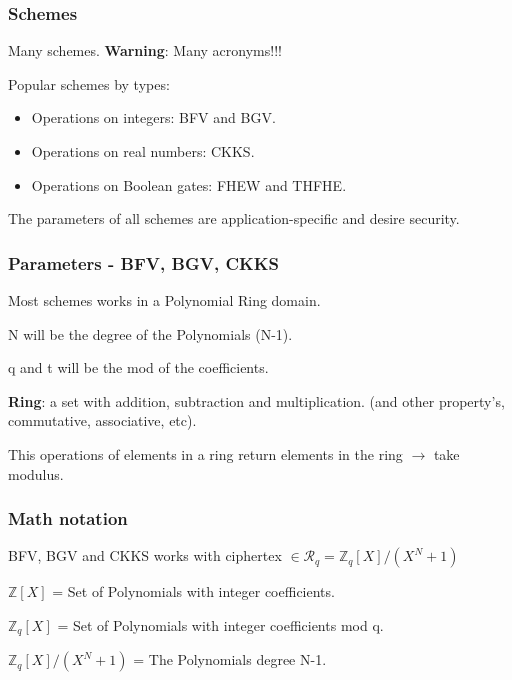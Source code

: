 \documentclass[10pt,handout]{beamer}
\begin{document}


\begin{frame}
    \frametitle{Schemes}

    Many schemes. \textbf{Warning}: Many acronyms!!!

    Popular schemes by types:
    \begin{itemize}
        \item Operations on integers: BFV and BGV.
        \item Operations on real numbers: CKKS.
        \item Operations on Boolean gates: FHEW and THFHE.
    \end{itemize}


    The parameters of all schemes are application-specific and desire security.
\end{frame}



\begin{frame}
\frametitle{Parameters - BFV, BGV, CKKS}

Most schemes works in a Polynomial Ring domain.

N will be the degree of the Polynomials (N-1).

q and t will be the mod of the coefficients.

\textbf{Ring}: a set with addition, subtraction and multiplication. (and other property's, commutative, associative, etc).

This operations of elements in a ring return elements in the ring $\rightarrow$ take modulus.




\end{frame}



\begin{frame}
\frametitle{Math notation}
BFV, BGV and CKKS works with ciphertex  $\in \mathcal{R}_q =\mathbb{Z}_q[X]/(X^N+1)$

$\mathbb{Z}[X]$ = Set of Polynomials with integer coefficients.

$\mathbb{Z}_q[X]$ = Set of Polynomials with integer coefficients mod q.

$\mathbb{Z}_q[X]/(X^N+1)$ = The Polynomials degree N-1.


\end{frame}
\end{document}

